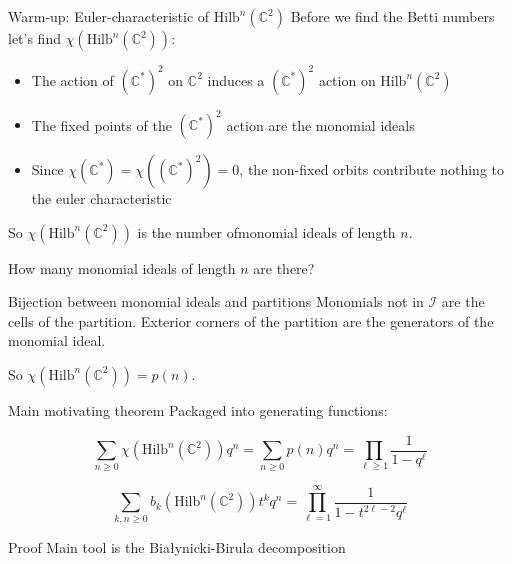 \documentclass{beamer}
\newcommand{\Hilb}{\textrm{Hilb}}
\newcommand{\C}{\mathbb{C}}
\begin{document}
\begin{frame}{Warm-up: Euler-characteristic of $\Hilb^n(\C^2)$}
Before we find the Betti numbers let's find $\chi(\Hilb^n(\C^2))$:  

\begin{itemize}
\item The action of $(\C^*)^2$ on $\C^2$ induces a $(\C^*)^2$ action on $\Hilb^n(\C^2)$
\item The fixed points of the $(\C^*)^2$ action are the monomial ideals 
\item Since $\chi(\C^*)=\chi((\C^*)^2)=0$, the non-fixed orbits contribute nothing to the euler characteristic
\end{itemize}
So $\chi(\Hilb^n(\C^2))$ is the number ofmonomial ideals of length $n$.

\begin{block}{How many monomial ideals of length $n$ are there?}\end{block}



\end{frame}
\begin{frame}{Bijection between monomial ideals and partitions}
Monomials not in $\mathcal{I}$ are the cells of the partition.
Exterior corners of the partition are the generators of the monomial ideal.

\begin{center}


\end{center}
So $\chi(\Hilb^n(\C^2))=p(n)$.
\end{frame}

\begin{frame}{Main motivating theorem}
Packaged into generating functions:
\begin{Theorem}[Warm-up]
$$\sum_{n\geq 0} \chi(\Hilb^n(\C^2))q^n=\sum_{n\geq0} p(n)q^n=\prod_{\ell\geq 1} \frac{1}{1-q^\ell}$$
\end{Theorem}

\begin{theorem}
$$\sum_{k,n \geq 0} b_k(\Hilb^n(\C^2))t^k q^n=\prod_{\ell=1}^\infty \frac{1}{1-t^{2\ell-2}q^\ell}$$
\end{theorem}
\begin{block}{Proof}
 Main tool is the \alert{Bia\l ynicki-Birula decomposition}
 \end{block}

\end{frame}
\end{document}
